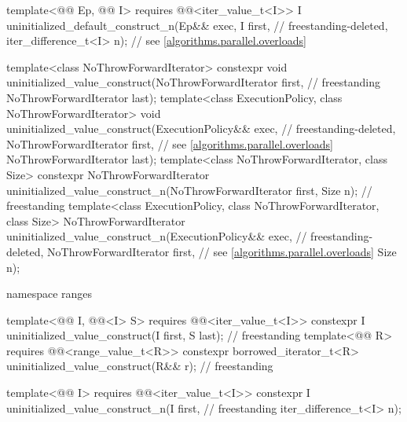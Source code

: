 \begin{codeblock}
{{    template<@@ Ep, @@ I>
      requires @@<iter_value_t<I>>
        I uninitialized_default_construct_n(Ep&& exec, I first,             // freestanding-deleted,
                                            iter_difference_t<I> n);        // see \ref{algorithms.parallel.overloads}
  }

  template<class NoThrowForwardIterator>
    constexpr void uninitialized_value_construct(NoThrowForwardIterator first,      // freestanding
                                                 NoThrowForwardIterator last);
  template<class ExecutionPolicy, class NoThrowForwardIterator>
    void uninitialized_value_construct(ExecutionPolicy&& exec,              // freestanding-deleted,
                                       NoThrowForwardIterator first,        // see \ref{algorithms.parallel.overloads}
                                       NoThrowForwardIterator last);
  template<class NoThrowForwardIterator, class Size>
    constexpr NoThrowForwardIterator
      uninitialized_value_construct_n(NoThrowForwardIterator first, Size n);        // freestanding
  template<class ExecutionPolicy, class NoThrowForwardIterator, class Size>
    NoThrowForwardIterator
      uninitialized_value_construct_n(ExecutionPolicy&& exec,               // freestanding-deleted,
                                      NoThrowForwardIterator first,         // see \ref{algorithms.parallel.overloads}
                                      Size n);

  namespace ranges {
    template<@@ I, @@<I> S>
      requires @@<iter_value_t<I>>
        constexpr I uninitialized_value_construct(I first, S last);                 // freestanding
    template<@@ R>
      requires @@<range_value_t<R>>
        constexpr borrowed_iterator_t<R> uninitialized_value_construct(R&& r);      // freestanding

    template<@@ I>
      requires @@<iter_value_t<I>>
        constexpr I uninitialized_value_construct_n(I first,                        // freestanding
                                                    iter_difference_t<I> n);

}}
\end{codeblock}
